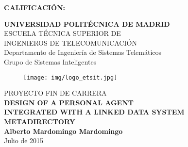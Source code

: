 {\large{\bf CALIFICACIÓN:}}
\pagestyle{empty}
\cleardoublepage
\vspace*{\baselineskip}
\begin{center}
	{\LARGE\rm\textbf{UNIVERSIDAD POLITÉCNICA DE MADRID}\\
	\vspace{1.0cm}
	 ESCUELA TÉCNICA SUPERIOR DE\\ INGENIEROS DE TELECOMUNICACIÓN
	  }  \\

	 {\Large\rm Departamento de Ingeniería de Sistemas Telemáticos\\
	 Grupo de Sistemas Inteligentes  }  \\

\begin{figure}[!htbp]
	\centering
    \texttt{[image: img/logo\_etsit.jpg]}

\end{figure}
	\vspace{1.0cm}
	{{\LARGE\rm PROYECTO FIN DE CARRERA\\
	\vspace{2.0cm}
	 \textbf{DESIGN OF A PERSONAL AGENT}\\	 
	 \textbf{INTEGRATED WITH A LINKED DATA SYSTEM}\\ 
	 \vspace{0.5cm}
	 \textbf{METADIRECTORY} }}  \\
	 
	 \vspace{1.0cm}
     \Large\rm\textbf{Alberto Mardomingo Mardomingo}\\
	 \vspace{1.0cm}
	 Julio de 2015
\end{center}  
